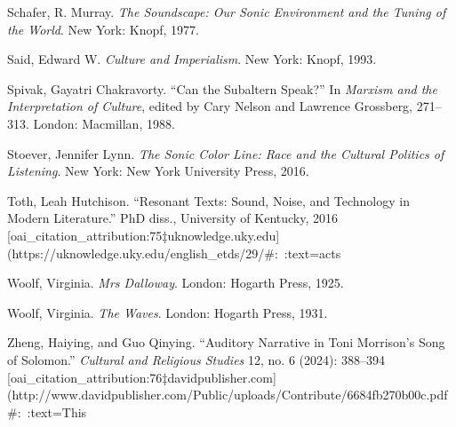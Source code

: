 \documentclass[12pt]{report}
\begin{document}
\begin{thebibliography}{99}
 Schafer, R. Murray. \textit{The Soundscape: Our Sonic Environment and the Tuning of the World}. New York: Knopf, 1977.

 Said, Edward W. \textit{Culture and Imperialism}. New York: Knopf, 1993.

 Spivak, Gayatri Chakravorty. “Can the Subaltern Speak?” In \textit{Marxism and the Interpretation of Culture}, edited by Cary Nelson and Lawrence Grossberg, 271–313. London: Macmillan, 1988.

 Stoever, Jennifer Lynn. \textit{The Sonic Color Line: Race and the Cultural Politics of Listening}. New York: New York University Press, 2016.

 Toth, Leah Hutchison. “Resonant Texts: Sound, Noise, and Technology in Modern Literature.” PhD diss., University of Kentucky, 2016 [oai_citation_attribution:75‡uknowledge.uky.edu](https://uknowledge.uky.edu/english_etds/29/#:~:text=acts%

 Woolf, Virginia. \textit{Mrs Dalloway}. London: Hogarth Press, 1925.

 Woolf, Virginia. \textit{The Waves}. London: Hogarth Press, 1931.

 Zheng, Haiying, and Guo Qinying. “Auditory Narrative in Toni Morrison’s Song of Solomon.” \textit{Cultural and Religious Studies} 12, no. 6 (2024): 388–394 [oai_citation_attribution:76‡davidpublisher.com](http://www.davidpublisher.com/Public/uploads/Contribute/6684fb270b00c.pdf#:~:text=This%

\end{thebibliography}
\end{document}
